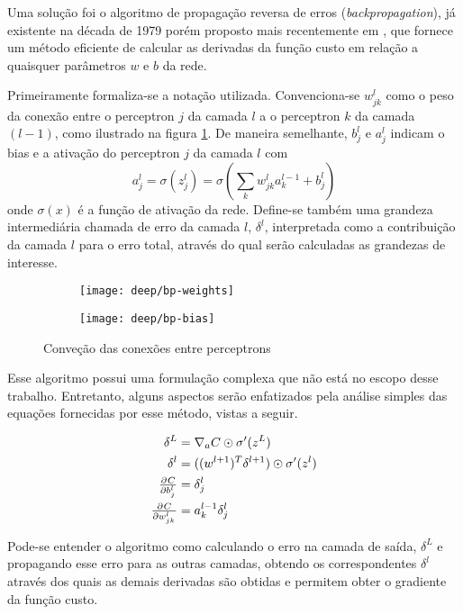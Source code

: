 Uma solução foi o algoritmo de propagação reversa de erros (\textit{backpropagation}), já existente na década de 1979 porém proposto mais recentemente em \cite{backpropagation}, que fornece um método eficiente de calcular as derivadas da função custo em relação a quaisquer parâmetros $w$ e $b$ da rede.

Primeiramente formaliza-se a notação utilizada. Convenciona-se $w_{jk}^l$ como o peso da conexão entre o perceptron $j$ da camada $l$ a o perceptron $k$ da camada $(l-1)$, como ilustrado na figura \ref{fig:bp}. De maneira semelhante, $b^l_j$ e $a^l_j$ indicam o bias e a ativação do perceptron $j$ da camada $l$ com
\begin{equation}
a^l_j = \sigma (z^l_j) =\sigma \left( \sum_k w_{jk}^l a_k^{l-1} + b_j^l \right)
\end{equation}
onde $\sigma(x)$ é a função de ativação da rede. Define-se também uma grandeza intermediária chamada de erro da camada $l$, $\delta^l$, interpretada como a contribuição da camada $l$ para o erro total, através do qual serão calculadas as grandezas de interesse.

\begin{figure}[ht]
\centering
\begin{subfigure}{.5\textwidth}
  \centering
  \texttt{[image: deep/bp-weights]}
\end{subfigure}%
\begin{subfigure}{.5\textwidth}
  \centering
  \texttt{[image: deep/bp-bias]}
\end{subfigure}
\caption{Conveção das conexões entre perceptrons}
\label{fig:bp}
\end{figure}

Esse algoritmo possui uma formulação complexa que não está no escopo desse trabalho. Entretanto, alguns aspectos serão enfatizados pela análise simples das equações fornecidas por esse método, vistas a seguir.

\begin{align}
\delta^L &= \nabla_a C \odot \sigma^\prime(z^L) \\ 
\delta^l &= ((w^{l+1})^T\delta^{l+1}) \odot \sigma^\prime(z^l) \\
\pd{C}{b_j^l{}} &= \delta_j^l \\ 
\pd{C}{w_{jk}^l{}} &= a_k^{l-1} \delta_j^l 
\end{align}

Pode-se entender o algoritmo como calculando o erro na camada de saída, $\delta^L$ e propagando esse erro para as outras camadas, obtendo os correspondentes $\delta^l$ através dos quais as demais derivadas são obtidas e permitem obter o gradiente da função custo. 


